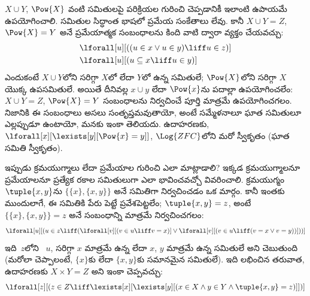 \documentclass[../../../include/open-logic-section]{subfiles}
\begin{document}
$X \cup Y$, $\Pow{X}$ వంటి సమితులపై పరిక్రియల గురించి చెప్పడానికీ
ఇలాంటి ఉపాయమే ఉపయోగించాలి. సమితుల సిద్ధాంత భాషలో ప్రమేయ సంకేతాలు లేవు.
కానీ $X \cup Y = Z$, $\Pow{X} = Y$ అనే ప్రమేయాత్మక సంబంధాలను కింది
వాటి ద్వారా వ్యక్తం చేయవచ్చు:
\begin{align*}
& \lforall[u][((u \in x \lor u \in y) \liff u \in z)]\\
& \lforall[u][(u \subseteq x \liff u \in y )]
\end{align*}
ఎందుకంటే $X \cup Y$లోని  సరిగ్గా $X$లో
 లేదా $Y$లో  ఉన్న సమితులే;
$\Pow{X}$లోని  సరిగ్గా
$X$ యొక్క ఉపసమితులే. అయితే దీనివల్ల $x \cup y$ లేదా $\Pow{x}$ను
పదాల్లా ఉపయోగించలేం: $X \cup Y = Z$, $\Pow{X} = Y$ సంబంధాలను
నిర్వచించే పూర్తి  మాత్రమే ఉపయోగించగలం. నిజానికి ఈ
సంబంధాలు అసలు సంతృప్తమవుతాయో, అంటే సమ్మేళనాలూ ఘాత సమితులూ
ఎల్లప్పుడూ ఉంటాయో, మనకు ఇంకా తెలియదు. ఉదాహరణకు, 
$\lforall[x][\lexists[y][\Pow{x} = y]]$, $\Log{ZFC}$లోని మరో
స్వీకృతం (ఘాత సమితి స్వీకృతం).

ఇప్పుడు క్రమయుగ్మాలు లేదా ప్రమేయాల గురించి ఎలా మాట్లాడాలి? ఇక్కడ
క్రమయుగ్మాలనూ ప్రమేయాలనూ ప్రత్యేక రకాల సమితులుగా ఎలా భావించవచ్చో
వివరించాలి. క్రమయుగ్మం~$\tuple{x,y}$ను
$\{\{x\},\{x,y\}\}$ అనే సమితిగా నిర్వచించడం ఒక మార్గం. కానీ ఇంతకు
ముందులాగే, ఈ సమితికి పేరు పెట్టే  ప్రవేశపెట్టలేం;
$\tuple{x,y}=z$, అంటే $\{\{x\},\{x,y\}\}=z$ అనే సంబంధాన్ని మాత్రమే
నిర్వచించగలం:
\[
\lforall[u][(u \in z \liff (\lforall[v][(v \in u \liff v = x)] \lor
  \lforall[v][(v \in u \liff (v = x \lor v = y))]))]
\]
ఇది~$z$లోని ~$u$, సరిగ్గా $x$ మాత్రమే 
ఉన్న లేదా $x$, $y$ మాత్రమే  ఉన్న సమితులే అని చెబుతుంది
(మరోలా చెప్పాలంటే, $\{x\}$కు లేదా $\{x,y\}$కు సమానమైన సమితులే).
ఇది లభించిన తరువాత, ఉదాహరణకు $X \times Y = Z$ అని ఇంకా చెప్పవచ్చు:
\[
\lforall[z][(z \in Z \liff \lexists[x][\lexists[y][(x \in
        X \land y \in Y \land \tuple{x, y} = z)]])]
\]
\end{document}
